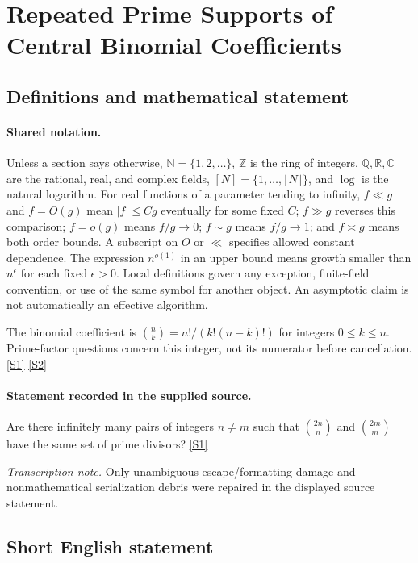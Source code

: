 \documentclass[11pt,a4paper]{article}
\newcommand{\N}{\mathbb{N}}
\newcommand{\Z}{\mathbb{Z}}
\newcommand{\Q}{\mathbb{Q}}
\newcommand{\R}{\mathbb{R}}
\newcommand{\C}{\mathbb{C}}
\newcommand{\sref}[2]{\hyperlink{source:#1:#2}{[S#2]}}
\begin{document}
\section{Repeated Prime Supports of Central Binomial Coefficients}\label{statement}


\subsection{Definitions and mathematical statement}

\paragraph{Shared notation.}Unless a section says otherwise, $\N=\{1,2,\ldots\}$,
$\Z$ is the ring of integers, $\Q,\R,\C$ are the rational, real, and complex
fields, $[N]=\{1,\ldots,\lfloor N\rfloor\}$, and $\log$ is the natural
logarithm. For real functions of a parameter tending to infinity,
$f\ll g$ and $f=O(g)$ mean $|f|\leq Cg$ eventually for some fixed $C$;
$f\gg g$ reverses this comparison; $f=o(g)$ means $f/g\to0$;
$f\sim g$ means $f/g\to1$; and $f\asymp g$ means both order bounds.
A subscript on $O$ or $\ll$ specifies allowed constant dependence.
The expression $n^{o(1)}$ in an upper bound means growth smaller than
$n^\epsilon$ for each fixed $\epsilon>0$. Local definitions govern any
exception, finite-field convention, or use of the same symbol for another
object. An asymptotic claim is not automatically an effective algorithm.



The binomial coefficient is $\binom nk=n!/(k!(n-k)!)$ for integers $0\leq k\leq n$. Prime-factor questions concern this integer, not its numerator before cancellation. \sref{statement}{1} \sref{statement}{2}

\paragraph{Statement recorded in the supplied source.}
Are there infinitely many pairs of integers $n\neq m$ such that $\binom{2n}{n}$ and $\binom{2m}{m}$ have the same set of prime divisors? \sref{statement}{1}

{\small\emph{Transcription note.} Only unambiguous escape/formatting damage and nonmathematical serialization debris were repaired in the displayed source statement.}

\subsection{Short English statement}
\end{document}
